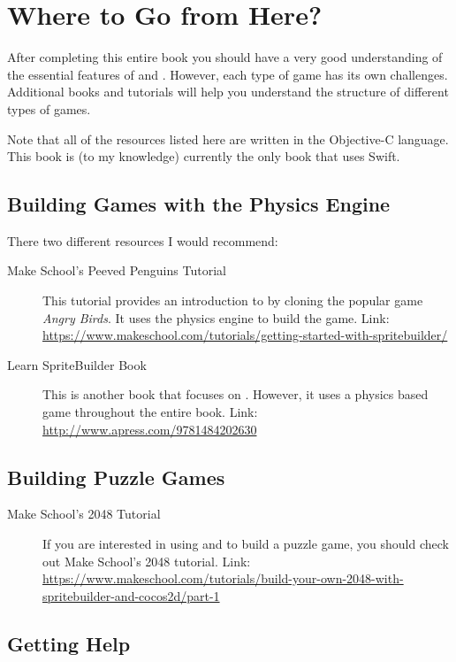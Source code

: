 \chapter{Where to Go from Here?}

After completing this entire book you should have a very good understanding of
the essential features of \SB{} and \cocos{}. However, each type of game has its
own challenges. Additional books and tutorials will help you understand the
structure of different types of games.

Note that all of the resources listed here are written in the Objective-C
language. This book is (to my knowledge) currently the only book that uses
Swift.

\section{Building Games with the Physics Engine}
There two different resources I would recommend:

\begin{description}
\item[Make School's Peeved Penguins Tutorial] This tutorial provides an
introduction to \SB{} by cloning the popular game \textit{Angry Birds}. It uses
the physics engine to build the game. Link:
\url{https://www.makeschool.com/tutorials/getting-started-with-spritebuilder/}
\item[Learn SpriteBuilder Book] This is another book that focuses on \SB{}.
However, it uses a physics based game throughout the entire book. Link:
\url{http://www.apress.com/9781484202630}
\end{description}

\section{Building Puzzle Games}

\begin{description}
\item[Make School's 2048 Tutorial] If you are interested in using \SB{} and \cocos{} to build a puzzle game, you
should check out Make School's 2048 tutorial. Link:
\url{https://www.makeschool.com/tutorials/build-your-own-2048-with-spritebuilder-and-cocos2d/part-1}
\end{description}

\section{Getting Help}

